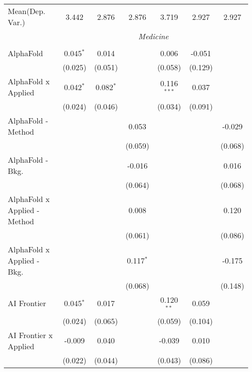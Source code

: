 \begin{tabular}{lcccccc}
Mean(Dep. Var.) & 3.442 & 2.876 & 2.876 & 3.719 & 2.927 & 2.927 \\
 & \multicolumn{6}{c}{\textit{Medicine}} \\ \\
   AlphaFold                      & 0.045$^{*}$  & 0.014        &              & 0.006         & -0.051  &   \\   
                                  & (0.025)      & (0.051)      &              & (0.058)       & (0.129) &   \\   
   AlphaFold x Applied            & 0.042$^{*}$  & 0.082$^{*}$  &              & 0.116$^{***}$ & 0.037   &   \\   
                                  & (0.024)      & (0.046)      &              & (0.034)       & (0.091) &   \\   
   AlphaFold - Method             &              &              & 0.053        &               &         & -0.029\\   
                                  &              &              & (0.059)      &               &         & (0.068)\\   
   AlphaFold - Bkg.               &              &              & -0.016       &               &         & 0.016\\   
                                  &              &              & (0.064)      &               &         & (0.068)\\   
   AlphaFold x Applied - Method   &              &              & 0.008        &               &         & 0.120\\   
                                  &              &              & (0.061)      &               &         & (0.086)\\   
   AlphaFold x Applied - Bkg.     &              &              & 0.117$^{*}$  &               &         & -0.175\\   
                                  &              &              & (0.068)      &               &         & (0.148)\\   
   AI Frontier                    & 0.045$^{*}$  & 0.017        &              & 0.120$^{**}$  & 0.059   &   \\   
                                  & (0.024)      & (0.065)      &              & (0.059)       & (0.104) &   \\   
   AI Frontier x Applied          & -0.009       & 0.040        &              & -0.039        & 0.010   &   \\   
                                  & (0.022)      & (0.044)      &              & (0.043)       & (0.086) &   \\   

\end{tabular}
